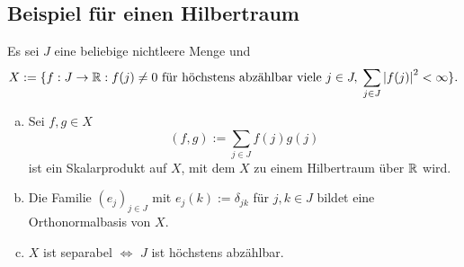 \documentclass[FunkAnaskriptSS2017.tex]{subfiles}
\begin{document}
\subsection{ Beispiel für einen Hilbertraum}
\label{B5.1}
Es sei $J$ eine beliebige nichtleere Menge und
	$$X:=\{ f: J \to \mathbb{R} : f(j) \not = 0 \text{ für höchstens abzählbar viele } j\in J,\; \sum_{j\in J} \left\lvert f(j) \right\rvert ^2 < \infty\}.$$
	\begin{beh}
	
	\begin{enumerate}[(a)]
	\item Sei $f,g \in X$
		$$(f,g) := \sum_{j\in J} f(j)g(j) $$
		ist ein Skalarprodukt auf $X$, mit dem $X$ zu einem Hilbertraum über $\mathbb{R}$ wird.
	
	\item Die Familie $(e_j)_{j\in J}$ mit $e_j(k) := \delta_{jk} $ für $j,k\in J$ bildet eine Orthonormalbasis von $X$.
	
	\item $X$ ist separabel $\Leftrightarrow$ $J$ ist höchstens abzählbar.	
	\end{enumerate}
	\end{beh}
\end{document}
